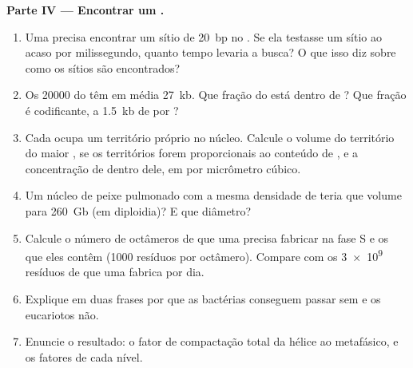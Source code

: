 \begin{problem}
\medskip
\noindent\textbf{Parte IV --- Encontrar um .}
\begin{enumerate}[resume]
  \item Uma  precisa encontrar um sítio de \qty{20}{bp} no
        . Se ela testasse um sítio ao acaso por milissegundo,
        quanto tempo levaria a busca? O que isso diz sobre como os
        sítios são encontrados?
  \item Os \qty{20000}{}  do  têm em média \qty{27}{kb}. Que
        fração do  está dentro de ? Que fração é
        codificante, a \qty{1.5}{kb} de  por ?
  \item Cada  ocupa um território próprio no núcleo. Calcule o
        volume do território do maior , se os territórios
        forem proporcionais ao conteúdo de , e a concentração de 
        dentro dele, em  por micrômetro cúbico.
  \item Um núcleo de peixe pulmonado com a mesma densidade de  teria
        que volume para \qty{260}{Gb} (em diploidia)? E que diâmetro?
  \item Calcule o número de octâmeros de  que uma  precisa
        fabricar na fase S e os  que eles contêm
        (\qty{1000}{} resíduos por octâmero). Compare com os
        \qty{3e9}{} resíduos de  que uma  fabrica por dia.
  \item Explique em duas frases por que as bactérias conseguem passar
        sem  e os eucariotos não.
  \item Enuncie o resultado: o fator de compactação total da hélice ao
         metafásico, e os fatores de cada nível.
\end{enumerate}
\end{problem}
